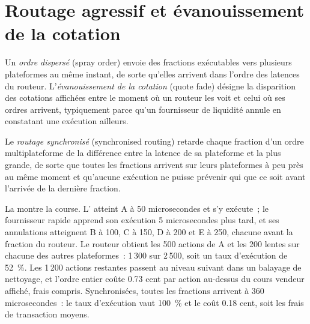 \label{lst:mx:smart-order-routing:router}

\section{Routage agressif et évanouissement de la cotation}

\begin{definition}\label{def:mx:smart-order-routing:spray}
Un \emph{ordre dispersé} (spray order) envoie des fractions exécutables vers plusieurs plateformes au même instant, de sorte qu'elles arrivent dans l'ordre des
latences du routeur. L'\emph{évanouissement de la cotation} (quote fade) désigne la disparition des cotations affichées entre le moment où un routeur les voit et celui où ses
ordres arrivent, typiquement parce qu'un fournisseur de liquidité annule en constatant une exécution ailleurs.
\end{definition}

\begin{definition}\label{def:mx:smart-order-routing:sync}
Le \emph{routage synchronisé} (synchronised routing) retarde chaque fraction d'un ordre multiplateforme de la différence entre la latence de sa plateforme et la
plus grande, de sorte que toutes les fractions arrivent sur leurs plateformes à peu près au même moment et qu'aucune exécution ne puisse prévenir qui que ce soit avant l'arrivée de la dernière fraction.
\end{definition}

La  montre la course. L' atteint A à 50 microsecondes et s'y exécute~; le fournisseur rapide apprend son exécution 5
microsecondes plus tard, et ses annulations atteignent B à 100, C à 150, D à 200 et E à 250, chacune avant la fraction du routeur. Le routeur obtient les 500 actions de A et
les 200 lentes sur chacune des autres plateformes~: 1\,300 sur 2\,500, soit un taux d'exécution de 52~\%. Les 1\,200 actions restantes passent au niveau suivant dans un balayage de nettoyage, et l'ordre entier
coûte 0.73 cent par action au-dessus du cours vendeur affiché, frais compris. Synchronisées, toutes les fractions arrivent à 360 microsecondes~: le taux d'exécution vaut 100~\%
et le coût 0.18 cent, soit les frais de transaction moyens.


